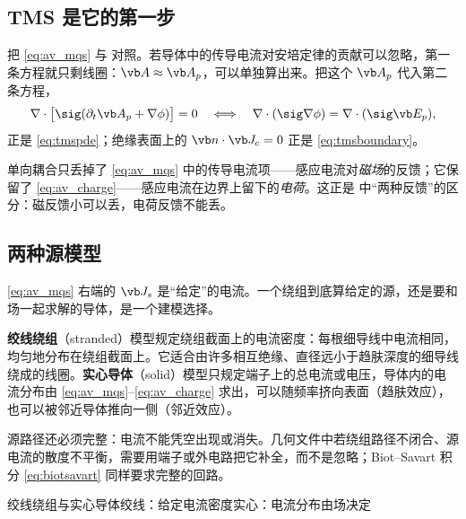 \subsection{TMS 是它的第一步}
把 \eqref{eq:av_mqs} 与 对照。若导体中的传导电流对安培定律的贡献可以忽略，第一条方程就只剩线圈：$\vb A\approx\vb A_p$，可以单独算出来。把这个 $\vb A_p$ 代入第二条方程，
\begin{equation}
\nabla\cdot\bigl[\sig(\partial_t\vb A_p+\nabla\phi)\bigr]=0\quad\Longleftrightarrow\quad\nabla\cdot(\sig\nabla\phi)=\nabla\cdot(\sig\vb E_p),
\end{equation}
正是 \eqref{eq:tmspde}；绝缘表面上的 $\vb n\cdot\vb J_c=0$ 正是 \eqref{eq:tmsboundary}。

\begin{intuition}[单向耦合丢掉了哪一项]
单向耦合只丢掉了 \eqref{eq:av_mqs} 中的传导电流项——感应电流对\emph{磁场}的反馈；它保留了 \eqref{eq:av_charge}——感应电流在边界上留下的\emph{电荷}。这正是 中“两种反馈”的区分：磁反馈小可以丢，电荷反馈不能丢。
\end{intuition}

\subsection{两种源模型}
\eqref{eq:av_mqs} 右端的 $\vb J_s$ 是“给定”的电流。一个绕组到底算给定的源，还是要和场一起求解的导体，是一个建模选择。

\textbf{绞线绕组}（stranded）模型规定绕组截面上的电流密度：每根细导线中电流相同，均匀地分布在绕组截面上。它适合由许多相互绝缘、直径远小于趋肤深度的细导线绕成的线圈。\textbf{实心导体}（solid）模型只规定端子上的总电流或电压，导体内的电流分布由 \eqref{eq:av_mqs}--\eqref{eq:av_charge} 求出，可以随频率挤向表面（趋肤效应），也可以被邻近导体推向一侧（邻近效应）。

源路径还必须完整：电流不能凭空出现或消失。几何文件中若绕组路径不闭合、源电流的散度不平衡，需要用端子或外电路把它补全，而不是忽略；Biot--Savart 积分 \eqref{eq:biotsavart} 同样要求完整的回路。

\begin{compare}{绞线绕组与实心导体}{绞线：给定电流密度}{实心：电流分布由场决定}
\end{compare}

